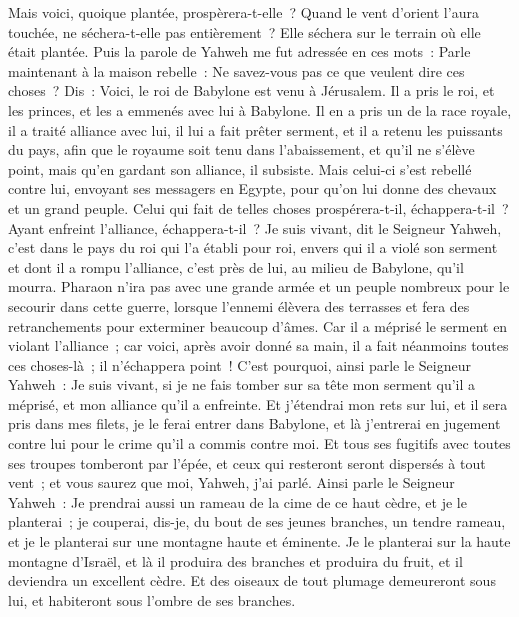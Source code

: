 \begin{multicols}{2}
Mais voici, quoique plantée, prospèrera-t-elle~? Quand le vent d'orient l'aura touchée, ne séchera-t-elle pas entièrement~? Elle séchera sur le terrain où elle était plantée.
Puis la parole de Yahweh me fut adressée en ces mots~:
Parle maintenant à la maison rebelle~: Ne savez-vous pas ce que veulent dire ces choses~? Dis~: Voici, le roi de Babylone est venu à Jérusalem. Il a pris le roi, et les princes, et les a emmenés avec lui à Babylone.
Il en a pris un de la race royale, il a traité alliance avec lui, il lui a fait prêter serment, et il a retenu les puissants du pays,
afin que le royaume soit tenu dans l'abaissement, et qu'il ne s'élève point, mais qu'en gardant son alliance, il subsiste.
Mais celui-ci s'est rebellé contre lui, envoyant ses messagers en Egypte, pour qu'on lui donne des chevaux et un grand peuple. Celui qui fait de telles choses prospérera-t-il, échappera-t-il~? Ayant enfreint l'alliance, échappera-t-il~?
Je suis vivant, dit le Seigneur Yahweh, c'est dans le pays du roi qui l'a établi pour roi, envers qui il a violé son serment et dont il a rompu l'alliance, c'est près de lui, au milieu de Babylone, qu'il mourra.
Pharaon n'ira pas avec une grande armée et un peuple nombreux pour le secourir dans cette guerre, lorsque l'ennemi élèvera des terrasses et fera des retranchements pour exterminer beaucoup d'âmes.
Car il a méprisé le serment en violant l'alliance~; car voici, après avoir donné sa main, il a fait néanmoins toutes ces choses-là~; il n'échappera point~!
C'est pourquoi, ainsi parle le Seigneur Yahweh~: Je suis vivant, si je ne fais tomber sur sa tête mon serment qu'il a méprisé, et mon alliance qu'il a enfreinte.
Et j'étendrai mon rets sur lui, et il sera pris dans mes filets, je le ferai entrer dans Babylone, et là j'entrerai en jugement contre lui pour le crime qu'il a commis contre moi.
Et tous ses fugitifs avec toutes ses troupes tomberont par l'épée, et ceux qui resteront seront dispersés à tout vent~; et vous saurez que moi, Yahweh, j'ai parlé.
Ainsi parle le Seigneur Yahweh~: Je prendrai aussi un rameau de la cime de ce haut cèdre, et je le planterai~; je couperai, dis-je, du bout de ses jeunes branches, un tendre rameau, et je le planterai sur une montagne haute et éminente.
Je le planterai sur la haute montagne d'Israël, et là il produira des branches et produira du fruit, et il deviendra un excellent cèdre. Et des oiseaux de tout plumage demeureront sous lui, et habiteront sous l'ombre de ses branches.

\end{multicols}
